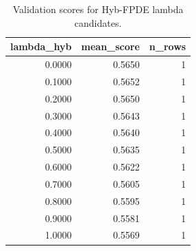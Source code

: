 \begin{table}[t]
\caption{Validation scores for Hyb-FPDE lambda candidates.}
\label{tab:lambda_distribution_computed}
\centering
\begin{tabular}{rrr}
\toprule
lambda\_hyb & mean\_score & n\_rows \\
\midrule
0.0000 & 0.5650 & 1 \\
0.1000 & 0.5652 & 1 \\
0.2000 & 0.5650 & 1 \\
0.3000 & 0.5643 & 1 \\
0.4000 & 0.5640 & 1 \\
0.5000 & 0.5635 & 1 \\
0.6000 & 0.5622 & 1 \\
0.7000 & 0.5605 & 1 \\
0.8000 & 0.5595 & 1 \\
0.9000 & 0.5581 & 1 \\
1.0000 & 0.5569 & 1 \\
\bottomrule
\end{tabular}

\end{table}
